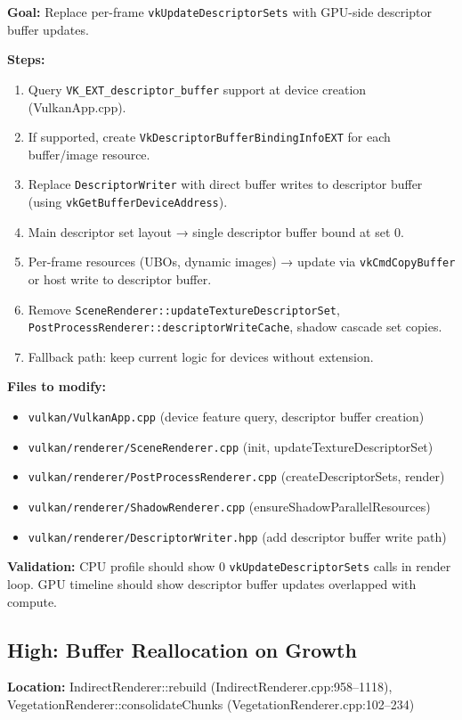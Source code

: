 \documentclass[11pt,a4paper]{article}
\begin{document}
\begin{tcolorbox}[promptbox={Prompt: Adopt Descriptor Buffers (VK\_EXT\_descriptor\_buffer)}]
\textbf{Goal:} Replace per-frame \texttt{vkUpdateDescriptorSets} with GPU-side descriptor buffer updates.

\textbf{Steps:}
\begin{enumerate}
    \item Query \texttt{VK\_EXT\_descriptor\_buffer} support at device creation (VulkanApp.cpp).
    \item If supported, create \texttt{VkDescriptorBufferBindingInfoEXT} for each buffer/image resource.
    \item Replace \texttt{DescriptorWriter} with direct buffer writes to descriptor buffer (using \texttt{vkGetBufferDeviceAddress}).
    \item Main descriptor set layout → single descriptor buffer bound at set 0.
    \item Per-frame resources (UBOs, dynamic images) → update via \texttt{vkCmdCopyBuffer} or host write to descriptor buffer.
    \item Remove \texttt{SceneRenderer::updateTextureDescriptorSet}, \texttt{PostProcessRenderer::descriptorWriteCache}, shadow cascade set copies.
    \item Fallback path: keep current logic for devices without extension.
\end{enumerate}

\textbf{Files to modify:}
\begin{itemize}
    \item \texttt{vulkan/VulkanApp.cpp} (device feature query, descriptor buffer creation)
    \item \texttt{vulkan/renderer/SceneRenderer.cpp} (init, updateTextureDescriptorSet)
    \item \texttt{vulkan/renderer/PostProcessRenderer.cpp} (createDescriptorSets, render)
    \item \texttt{vulkan/renderer/ShadowRenderer.cpp} (ensureShadowParallelResources)
    \item \texttt{vulkan/renderer/DescriptorWriter.hpp} (add descriptor buffer write path)
\end{itemize}

\textbf{Validation:} CPU profile should show 0 \texttt{vkUpdateDescriptorSets} calls in render loop. GPU timeline should show descriptor buffer updates overlapped with compute.
\end{tcolorbox}

\subsection{High: Buffer Reallocation on Growth}
\textbf{Location:} IndirectRenderer::rebuild (IndirectRenderer.cpp:958–1118), VegetationRenderer::consolidateChunks (VegetationRenderer.cpp:102–234)
\end{document}
